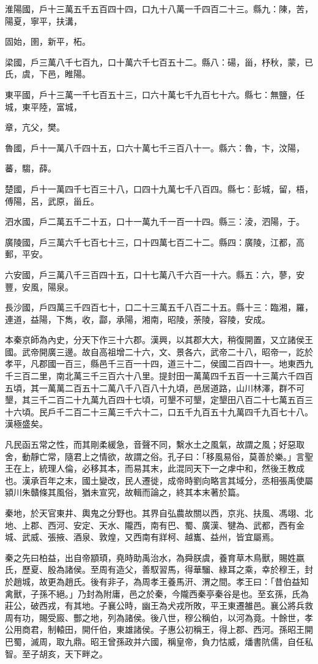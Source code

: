 \begin{pinyinscope}
淮陽國，戶十三萬五千五百四十四，口九十八萬一千四百二十三。縣九：陳，苦，陽夏，寧平，扶溝，

固始，圉，新平，柘。

梁國，戶三萬八千七百九，口十萬六千七百五十二。縣八：碭，甾，杼秋，蒙，已氏，虞，下邑，睢陽。

東平國，戶十三萬一千七百五十三，口六十萬七千九百七十六。縣七：無鹽，任城，東平陸，富城，

章，亢父，樊。

魯國，戶十一萬八千四十五，口六十萬七千三百八十一。縣六：魯，卞，汶陽，

蕃，騶，薛。

楚國，戶十一萬四千七百三十八，口四十九萬七千八百四。縣七：彭城，留，梧，傅陽，呂，武原，甾丘。

泗水國，戶二萬五千二十五，口十一萬九千一百一十四。縣三：淩，泗陽，于。

廣陵國，戶三萬六千七百七十三，口十四萬七百二十二。縣四：廣陵，江都，高郵，平安。

六安國，戶三萬八千三百四十五，口十七萬八千六百一十六。縣五：六，蓼，安豐，安風，陽泉。

長沙國，戶四萬三千四百七十，口二十三萬五千八百二十五。縣十三：臨湘，羅，連道，益陽，下雋，收，酃，承陽，湘南，昭陵，荼陵，容陵，安成。

本秦京師為內史，分天下作三十六郡。漢興，以其郡大大，稍復開置，又立諸侯王國。武帝開廣三邊。故自高祖增二十六，文、景各六，武帝二十八，昭帝一，訖於孝平，凡郡國一百三，縣邑千三百一十四，道三十二，侯國二百四十一。地東西九千三百二里，南北萬三千三百六十八里。提封田一萬萬四千五百一十三萬六千四百五頃，其一萬萬二百五十二萬八千八百八十九頃，邑居道路，山川林澤，群不可墾，其三千二百二十九萬九百四十七頃，可墾不可墾，定墾田八百二十七萬五百三十六頃。民戶千二百二十三萬三千六十二，口五千九百五十九萬四千九百七十八。漢極盛矣。

凡民函五常之性，而其剛柔緩急，音聲不同，繫水土之風氣，故謂之風；好惡取舍，動靜亡常，隨君上之情欲，故謂之俗。孔子曰：「移風易俗，莫善於樂。」言聖王在上，統理人倫，必移其本，而易其末，此混同天下一之虖中和，然後王教成也。漢承百年之末，國土變改，民人遷徙，成帝時劉向略言其域分，丞相張禹使屬潁川朱贛條其風俗，猶未宣究，故輯而論之，終其本末著於篇。

秦地，於天官東井、輿鬼之分野也。其界自弘農故關以西，京兆、扶風、馮翊、北地、上郡、西河、安定、天水、隴西，南有巴、蜀、廣漢、犍為、武都，西有金城、武威、張掖、酒泉、敦煌，又西南有牂柯、越巂、益州，皆宜屬焉。

秦之先曰柏益，出自帝顓頊，堯時助禹治水，為舜朕虞，養育草木鳥獸，賜姓嬴氏，歷夏、殷為諸侯。至周有造父，善馭習馬，得華騮、綠耳之乘，幸於穆王，封於趙城，故更為趙氏。後有非子，為周孝王養馬汧、渭之間。孝王曰：「昔伯益知禽獸，子孫不絕。」乃封為附庸，邑之於秦，今隴西秦亭秦谷是也。至玄孫，氏為莊公，破西戎，有其地。子襄公時，幽王為犬戎所敗，平王東遷雒邑。襄公將兵救周有功，賜受廄、酆之地，列為諸侯。後八世，穆公稱伯，以河為竟。十餘世，孝公用商君，制轅田，開仟伯，東雄諸侯。子惠公初稱王，得上郡、西河。孫昭王開巴蜀，滅周，取九鼎。昭王曾孫政并六國，稱皇帝，負力怙威，燔書阬儒，自任私智。至子胡亥，天下畔之。


\end{pinyinscope}
